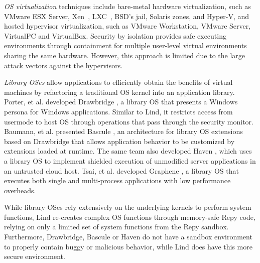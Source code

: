 \textit{OS virtualization}
techniques include
bare-metal hardware virtualization, such as VMware ESX Server, Xen~\cite{Xen-03},
LXC~\cite{LXC}, BSD's jail, Solaris zones, and Hyper-V, and
hosted hypervisor virtualization, such as VMware
Workstation, VMware Server, VirtualPC and VirtualBox.
Security by isolation \cite{Qubes, Overshadow, SecureVM, HypSec}
provides safe executing environments through containment for multiple
user-level virtual environments sharing the same hardware.
However, this approach is limited due to
the large attack vectors against the hypervisors.

\textit{Library OSes}
allow applications to efficiently obtain the benefits of virtual machines
by refactoring a traditional OS kernel into an application library.
Porter, et al. developed Drawbridge \cite{Drawbridge-11},
a library OS
that presents a Windows persona for %
Windows applications. Similar to Lind,
it restricts access from usermode to host OS through
operations that pass through the security monitor.
%
%
Baumann, et al. presented Bascule \cite{Bascule}, an architecture for library OS extensions
based on Drawbridge that allows application behavior to be customized by
extensions loaded at runtime. The same team also developed Haven \cite{Haven},
which uses a library OS to implement
shielded execution of unmodified server applications
in an untrusted cloud host.
Tsai, et al. developed Graphene \cite{Graphene-14}, a library OS that
executes both single and
multi-process applications with low performance overheads.

While library OSes rely extensively on
the underlying kernels to perform system functions,
Lind re-creates complex OS functions through memory-safe Repy
code, relying on only a limited set of system functions from the Repy
sandbox. Furthermore, Drawbridge, Bascule or Haven
do not have a sandbox environment to properly contain
buggy or malicious behavior, while Lind does have this more secure environment. 
